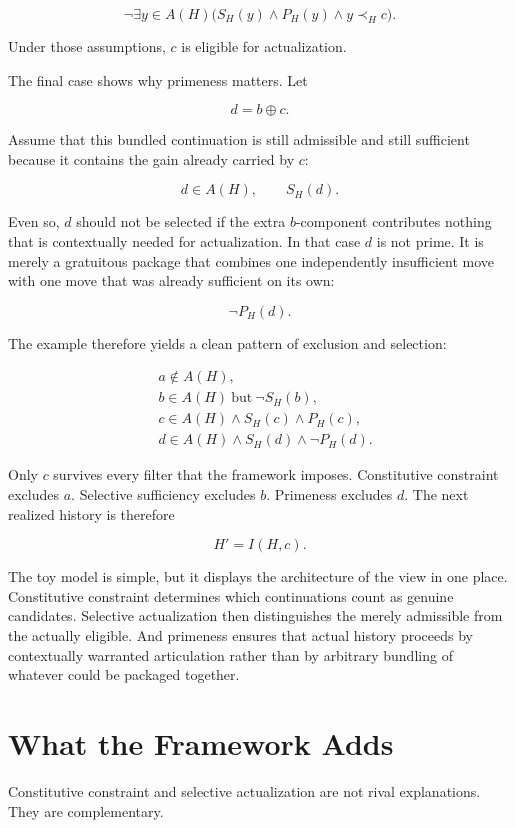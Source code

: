 \documentclass[11pt]{article}
\theoremstyle{foundation}
\begin{document}
\[
\neg \exists y \in A(H)\bigl(S_H(y) \wedge P_H(y) \wedge y \prec_H c\bigr).
\]

Under those assumptions, $c$ is eligible for actualization.

The final case shows why primeness matters. Let

\[
d = b \oplus c.
\]

Assume that this bundled continuation is still admissible and still sufficient because it contains the gain already carried by $c$:

\[
d \in A(H), \qquad S_H(d).
\]

Even so, $d$ should not be selected if the extra $b$-component contributes nothing that is contextually needed for actualization. In that case $d$ is not prime. It is merely a gratuitous package that combines one independently insufficient move with one move that was already sufficient on its own:

\[
\neg P_H(d).
\]

The example therefore yields a clean pattern of exclusion and selection:

\[
\begin{aligned}
&a \notin A(H),\\
&b \in A(H)\ \text{but}\ \neg S_H(b),\\
&c \in A(H) \wedge S_H(c) \wedge P_H(c),\\
&d \in A(H) \wedge S_H(d) \wedge \neg P_H(d).
\end{aligned}
\]

Only $c$ survives every filter that the framework imposes. Constitutive constraint excludes $a$. Selective sufficiency excludes $b$. Primeness excludes $d$. The next realized history is therefore

\[
H' = I(H,c).
\]

The toy model is simple, but it displays the architecture of the view in one place. Constitutive constraint determines which continuations count as genuine candidates. Selective actualization then distinguishes the merely admissible from the actually eligible. And primeness ensures that actual history proceeds by contextually warranted articulation rather than by arbitrary bundling of whatever could be packaged together.

\section{What the Framework Adds}

Constitutive constraint and selective actualization are not rival explanations. They are complementary.
\end{document}
